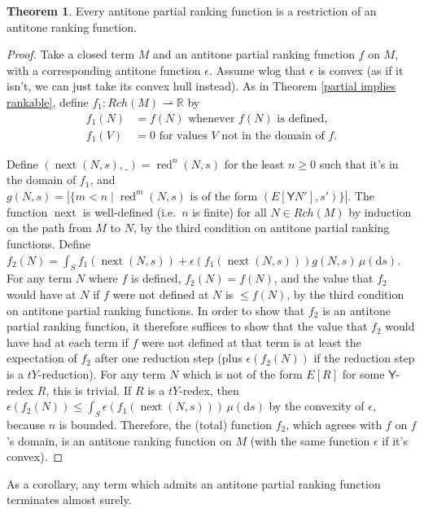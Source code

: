 \documentclass{article}
\newcommand{\tY}{\mathsf{Y}}
\DeclareMathOperator{\red}{red}
\DeclareMathOperator{\nnext}{next}
\theoremstyle{definition}
\theoremstyle{lemma}
\newtheorem{theorem}{Theorem}
\theoremstyle{remark}
\begin{document}
\begin{theorem}
  Every antitone partial ranking function is a restriction of an antitone ranking function.
\end{theorem}
\begin{proof}
  Take a closed term $M$ and an antitone partial ranking function $f$ on $M$, with a corresponding antitone function $\epsilon$. Assume wlog that $\epsilon$ is convex (as if it isn't, we can just take its convex hull instead). As in Theorem \ref{partial implies rankable}, define $f_1 : Rch(M) \rightharpoonup \mathbb R$ by
  \begin{align*}
    f_1(N) &= f(N) \text{ whenever $f(N)$ is defined},\\
    f_1(V) &= 0 \text{ for values $V$ not in the domain of $f$.}
  \end{align*}

  Define $(\nnext(N,s),\_) = \red^n(N,s)$ for the least $n \geq 0$ such that it's in the domain of $f_1$, and $g(N,s) = \left | \{m < n \mid \red^m(N,s) \text{ is of the form } (E[\tY N'],s') \} \right |$. 
  The function $\nnext$ is well-defined (i.e.~$n$ is finite) for all $N \in Rch(M)$ by induction on the path from $M$ to $N$, by the third condition on antitone partial ranking functions. Define $f_2(N) = \int_S f_1(\nnext(N,s)) + \epsilon(f_1(\nnext(N,s))) g(N,s) \, \mu(\mathrm d s)$. For any term $N$ where $f$ is defined, $f_2(N) = f(N)$, and the value that $f_2$ would have at $N$ if $f$ were not defined at $N$ is $\leq f(N)$, by the third condition on antitone partial ranking functions. In order to show that $f_2$ is an antitone partial ranking function, it therefore suffices to show that the value that $f_2$ would have had at each term if $f$ were not defined at that term is at least the expectation of $f_2$ after one reduction step (plus $\epsilon(f_2(N))$ if the reduction step is a $tY$-reduction). For any term $N$ which is not of the form $E[R]$ for some $\tY$-redex $R$, this is trivial. If $R$ is a $tY$-redex, then $\epsilon(f_2(N)) \leq \int_S \epsilon(f_1(\nnext(N,s)))\, \mu(\mathrm d s)$ by the convexity of $\epsilon$, because $n$ is bounded. Therefore, the (total) function $f_2$, which agrees with $f$ on $f$'s domain, is an antitone ranking function on $M$ (with the same function $\epsilon$ if it's convex).
\end{proof}

As a corollary, any term which admits an antitone partial ranking function terminates almost surely.
\end{document}
